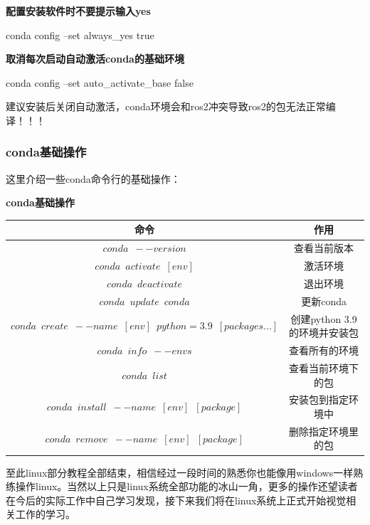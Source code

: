 \textbf{配置安装软件时不要提示输入yes}

\begin{tcode}
	conda config --set always_yes true
\end{tcode}

\textbf{取消每次启动自动激活conda的基础环境}

\begin{tcode}
	conda config --set auto_activate_base false
\end{tcode}

建议安装后关闭自动激活，conda环境会和ros2冲突导致ros2的包无法正常编译！！！

\subsubsection{conda基础操作}

这里介绍一些conda命令行的基础操作：

\begin{center}
\textbf{conda基础操作}
	\begin{tabular}{cc}
		\toprule[1.5pt]
		命令 & 作用\\
		\midrule[1pt]
		$  conda\enspace --version    $		&查看当前版本\\
		$  conda\enspace activate\enspace [env]    $		&激活环境\\
		$  conda\enspace deactivate   $		&退出环境\\
		$  conda\enspace update\enspace conda   $		&更新conda\\
		$  conda\enspace create\enspace --name\enspace [env]\enspace python=3.9\enspace [packages...]   $		&创建python 3.9的环境并安装包\\
		$  conda\enspace info\enspace --envs   $		&查看所有的环境\\
		$  conda\enspace list   $		&查看当前环境下的包\\
		$  conda\enspace install\enspace --name\enspace [env]\enspace [package]   $		&安装包到指定环境中\\
		$  conda\enspace remove\enspace --name\enspace [env]\enspace [package]   $		&删除指定环境里的包\\
		\bottomrule[1.5pt]
	\end{tabular}
\end{center}

至此linux部分教程全部结束，相信经过一段时间的熟悉你也能像用windows一样熟练操作linux。当然以上只是linux系统全部功能的冰山一角，更多的操作还望读者在今后的实际工作中自己学习发现，接下来我们将在linux系统上正式开始视觉相关工作的学习。

